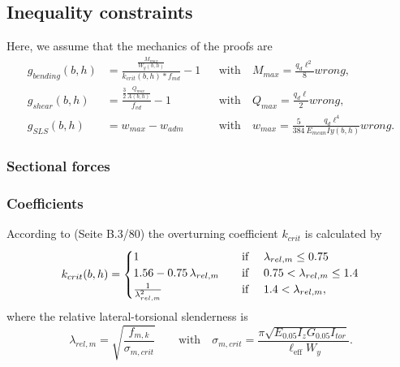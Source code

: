 \documentclass[a4paper]{article}
\begin{document}
\subsection{Inequality constraints}
Here, we assume that the mechanics of the proofs are
	\begin{align*}
		g_{bending}(b,h) &= \tfrac{\tfrac{M_{max}}{W_y(b,h)}}{ k_{crit}(b,h)*f_{md}}-1  &&\mbox{with} \quad M_{max} = \tfrac{q_d\ell^2}{8}wrong,\\
		g_{shear}(b,h) &=\tfrac{\tfrac{3}{2}\tfrac{Q_{max}}{A(b,h)}}{f_{vd}}  - 1 &&\mbox{with} \quad Q_{max} = \tfrac{q_d\ell}{2}wrong,\\
		g_{SLS}(b,h) &= w_{max} - w_{adm}&&\mbox{with} \quad w_{max} = \tfrac{5}{384} \tfrac{ q_d  \ell^4}{E_{mean} Iy(b,h)}wrong.
	\end{align*}
\subsubsection{Sectional forces}


\subsubsection{Coefficients}
According to (Seite B.3/80) the overturning coefficient $k_{crit}$ is calculated by 
	\begin{align*}
		k_{crit}(b,h) = \begin{cases}
			1 \quad &\text{if \quad} \lambda_{rel,m} \leq 0.75\\
			1.56-0.75 \,\lambda_{rel,m} \quad &\text{if \quad} 0.75 < \lambda_{rel,m} \leq 1.4\\
			\frac{1}{\lambda_{rel,m}^2} \quad &\text{if \quad} 1.4 < \lambda_{rel,m},
		\end{cases}
	\end{align*}
where the relative lateral-torsional slenderness is
\begin{equation*}
	\lambda_{rel,m} = \sqrt{\frac{f_{m,k}}{\sigma_{m,crit}}} \qquad \mbox{with} \quad \sigma_{m,crit} = \frac{\pi\sqrt{E_{0.05}I_zG_{0.05}I_{tor}}}{\ell_\text{eff}{W_y}}.
\end{equation*}
\newpage
\end{document}
